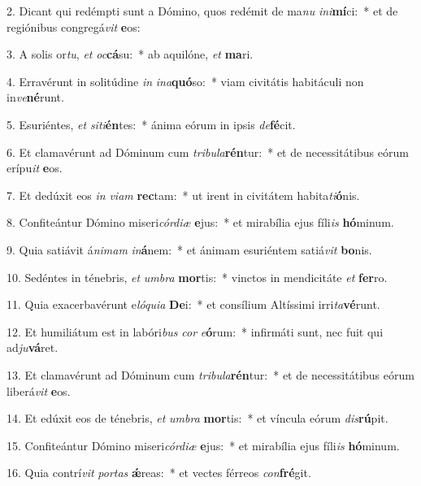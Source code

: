 2. Dicant qui redémpti sunt a Dómino, quos redémit de ma\textit{nu} \textit{in}\textit{i}\textbf{mí}ci:~*  et de regiónibus congregá\textit{vit} \textbf{e}os:\

3. A solis or\textit{tu}, \textit{et} \textit{oc}\textbf{cá}su:~*  ab aquilóne, \textit{et} \textbf{ma}ri.\

4. Erravérunt in solitúdine \textit{in} \textit{in}\textit{a}\textbf{quó}so:~*  viam civitátis habitáculi non in\textit{ve}\textbf{né}runt.\

5. Esuriéntes, \textit{et} \textit{si}\textit{ti}\textbf{én}tes:~*  ánima eórum in ipsis \textit{de}\textbf{fé}cit.\

6. Et clamavérunt ad Dóminum cum \textit{tri}\textit{bu}\textit{la}\textbf{rén}tur:~*  et de necessitátibus eórum erípu\textit{it} \textbf{e}os.\

7. Et dedúxit eos \textit{in} \textit{vi}\textit{am} \textbf{rec}tam:~*  ut irent in civitátem habita\textit{ti}\textbf{ó}nis.\

8. Confiteántur Dómino miseri\textit{cór}\textit{di}\textit{æ} \textbf{e}jus:~*  et mirabília ejus fíli\textit{is} \textbf{hó}minum.\

9. Quia satiávit á\textit{ni}\textit{mam} \textit{in}\textbf{á}nem:~*  et ánimam esuriéntem satiá\textit{vit} \textbf{bo}nis.\

10. Sedéntes in ténebris, \textit{et} \textit{um}\textit{bra} \textbf{mor}tis:~*  vinctos in mendicitáte \textit{et} \textbf{fer}ro.\

11. Quia exacerbavérunt e\textit{ló}\textit{qui}\textit{a} \textbf{De}i:~*  et consílium Altíssimi irri\textit{ta}\textbf{vé}runt.\

12. Et humiliátum est in labóri\textit{bus} \textit{cor} \textit{e}\textbf{ó}rum:~*  infirmáti sunt, nec fuit qui ad\textit{ju}\textbf{vá}ret.\

13. Et clamavérunt ad Dóminum cum \textit{tri}\textit{bu}\textit{la}\textbf{rén}tur:~*  et de necessitátibus eórum liberá\textit{vit} \textbf{e}os.\

14. Et edúxit eos de ténebris, \textit{et} \textit{um}\textit{bra} \textbf{mor}tis:~*  et víncula eórum \textit{dis}\textbf{rú}pit.\

15. Confiteántur Dómino miseri\textit{cór}\textit{di}\textit{æ} \textbf{e}jus:~*  et mirabília ejus fíli\textit{is} \textbf{hó}minum.\

16. Quia contrí\textit{vit} \textit{por}\textit{tas} \textbf{ǽ}reas:~*  et vectes férreos \textit{con}\textbf{fré}git.\

